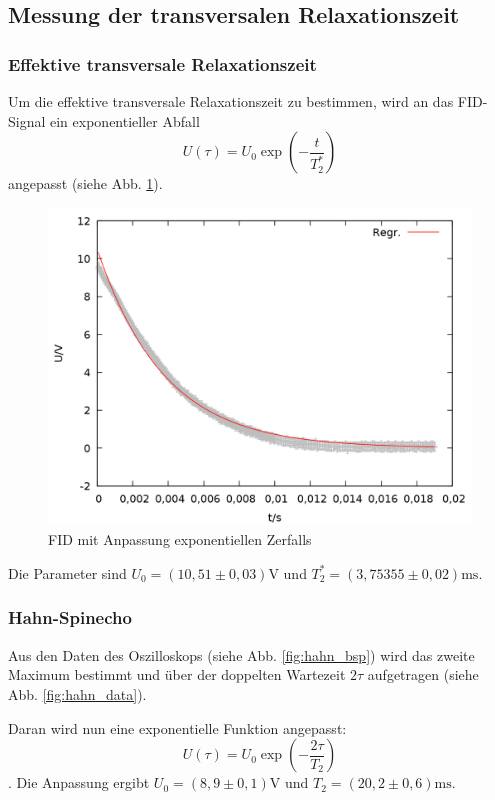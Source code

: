\subsection{Messung der transversalen Relaxationszeit}
\subsubsection{Effektive transversale Relaxationszeit}
Um die effektive transversale Relaxationszeit zu bestimmen, wird an das FID-Signal ein exponentieller Abfall $$U(\tau) = U_0\exp{\left(-\frac{t}{T_2^*}\right)}$$ angepasst (siehe Abb. \ref{fig:hahn_fid}).

\begin{figure}[h]
\centering
\includegraphics[width=0.75\linewidth]{data/p402_443_data/hahn_sequenz/out_fid.png}
\caption{FID mit Anpassung exponentiellen Zerfalls}
\label{fig:hahn_fid}
\end{figure}

Die Parameter sind $U_0 = (10,51\pm 0,03)\si{\volt}$ und $T_2^* = (3,75355\pm 0,02) \si{\milli\second}$. 

\subsubsection{Hahn-Spinecho}
Aus den Daten des Oszilloskops (siehe Abb. \ref{fig:hahn_bsp}) wird das zweite Maximum bestimmt und über der doppelten Wartezeit $2\tau$ aufgetragen (siehe Abb. \ref{fig:hahn_data}).

Daran wird nun eine exponentielle Funktion angepasst: $$U(\tau) = U_0\exp{\left(-\frac{2\tau}{T_2}\right)}$$. Die Anpassung ergibt $U_0 = (8,9\pm 0,1)\si{\volt}$ und $T_2 = (20,2\pm 0,6) \si{\milli\second}$.

